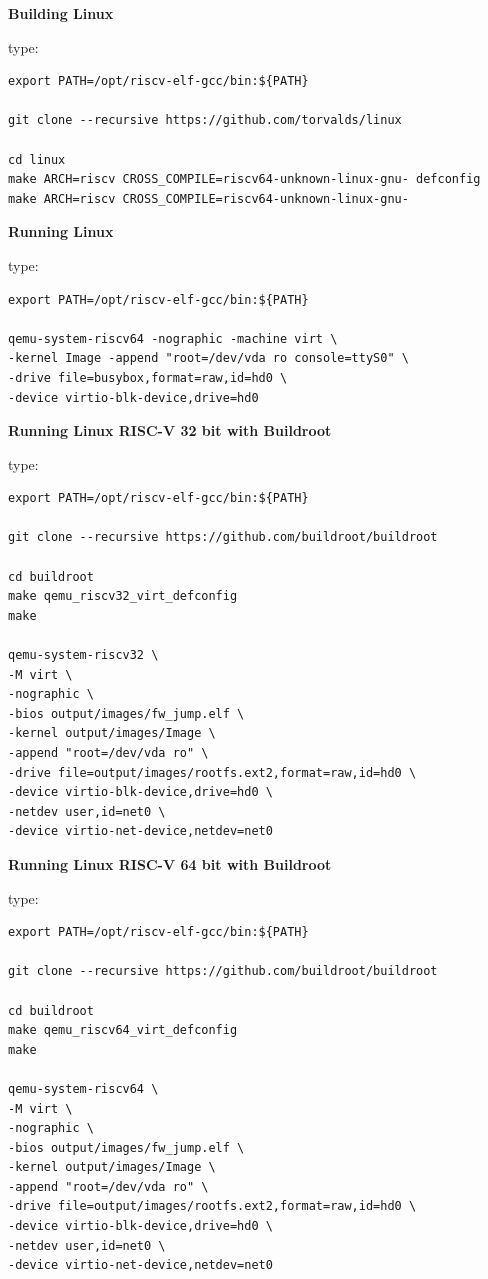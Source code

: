 \documentclass[
]{article}
\begin{document}
\textbf{Building Linux}

type:

\begin{verbatim}
export PATH=/opt/riscv-elf-gcc/bin:${PATH}

git clone --recursive https://github.com/torvalds/linux

cd linux
make ARCH=riscv CROSS_COMPILE=riscv64-unknown-linux-gnu- defconfig
make ARCH=riscv CROSS_COMPILE=riscv64-unknown-linux-gnu-
\end{verbatim}

\textbf{Running Linux}

type:

\begin{verbatim}
export PATH=/opt/riscv-elf-gcc/bin:${PATH}

qemu-system-riscv64 -nographic -machine virt \
-kernel Image -append "root=/dev/vda ro console=ttyS0" \
-drive file=busybox,format=raw,id=hd0 \
-device virtio-blk-device,drive=hd0
\end{verbatim}

\textbf{Running Linux RISC-V 32 bit with Buildroot}

type:

\begin{verbatim}
export PATH=/opt/riscv-elf-gcc/bin:${PATH}

git clone --recursive https://github.com/buildroot/buildroot

cd buildroot
make qemu_riscv32_virt_defconfig
make

qemu-system-riscv32 \
-M virt \
-nographic \
-bios output/images/fw_jump.elf \
-kernel output/images/Image \
-append "root=/dev/vda ro" \
-drive file=output/images/rootfs.ext2,format=raw,id=hd0 \
-device virtio-blk-device,drive=hd0 \
-netdev user,id=net0 \
-device virtio-net-device,netdev=net0
\end{verbatim}

\textbf{Running Linux RISC-V 64 bit with Buildroot}

type:

\begin{verbatim}
export PATH=/opt/riscv-elf-gcc/bin:${PATH}

git clone --recursive https://github.com/buildroot/buildroot

cd buildroot
make qemu_riscv64_virt_defconfig
make

qemu-system-riscv64 \
-M virt \
-nographic \
-bios output/images/fw_jump.elf \
-kernel output/images/Image \
-append "root=/dev/vda ro" \
-drive file=output/images/rootfs.ext2,format=raw,id=hd0 \
-device virtio-blk-device,drive=hd0 \
-netdev user,id=net0 \
-device virtio-net-device,netdev=net0
\end{verbatim}
\end{document}
